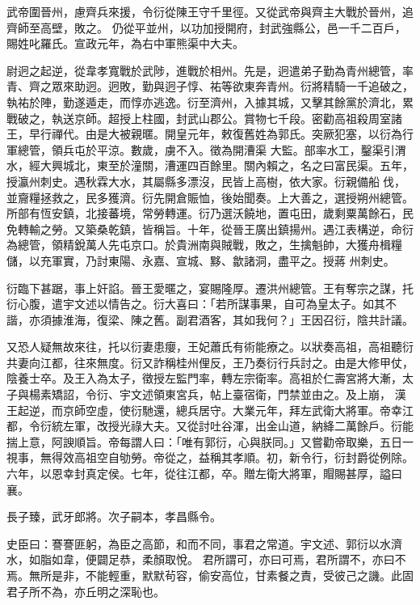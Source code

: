 \begin{pinyinscope}
 武帝圍晉州，慮齊兵來援，令衍從陳王守千里徑。又從武帝與齊主大戰於晉州，追齊師至高壁，敗之。
 仍從平並州，以功加授開府，封武強縣公，邑一千二百戶，賜姓叱羅氏。宣政元年，為右中軍熊渠中大夫。



 尉迥之起逆，從韋孝寬戰於武陟，進戰於相州。先是，迥遣弟子勤為青州總管，率青、齊之眾來助迥。迥敗，勤與迥子惇、祐等欲東奔青州。衍將精騎一千追破之，執祐於陣，勤遂遁走，而惇亦逃逸。衍至濟州，入據其城，又擊其餘黨於濟北，累戰破之，執送京師。超授上柱國，封武山郡公。賞物七千段。密勸高祖殺周室諸王，早行禪代。由是大被親暱。開皇元年，敕復舊姓為郭氏。突厥犯塞，以衍為行軍總管，領兵屯於平涼。數歲，虜不入。徵為開漕渠
 大監。部率水工，鑿渠引渭水，經大興城北，東至於潼關，漕運四百餘里。關內賴之，名之曰富民渠。五年，授瀛州刺史。遇秋霖大水，其屬縣多漂沒，民皆上高樹，依大家。衍親備船伐，並齎糧拯救之，民多獲濟。衍先開倉賑恤，後始聞奏。上大善之，選授朔州總管。所部有恆安鎮，北接蕃境，常勞轉運。衍乃選沃饒地，置屯田，歲剩粟萬餘石，民免轉輸之勞。又築桑乾鎮，皆稱旨。十年，從晉王廣出鎮揚州。遇江表構逆，命衍為總管，領精銳萬人先屯京口。於貴洲南與賊戰，敗之，生擒魁帥，大獲舟楫糧儲，以充軍實，乃討東陽、永嘉、宣城、黟、歙諸洞，盡平之。授蔣
 州刺史。



 衍臨下甚踞，事上奸諂。晉王愛暱之，宴賜隆厚。遷洪州總管。王有奪宗之謀，托衍心腹，遣宇文述以情告之。衍大喜曰：「若所謀事果，自可為皇太子。如其不諧，亦須據淮海，復梁、陳之舊。副君酒客，其如我何？」王因召衍，陰共計議。



 又恐人疑無故來往，托以衍妻患癭，王妃蕭氏有術能療之。以狀奏高祖，高祖聽衍共妻向江都，往來無度。衍又詐稱桂州俚反，王乃奏衍行兵討之。由是大修甲仗，陰養士卒。及王入為太子，徵授左監門率，轉左宗衛率。高祖於仁壽宮將大漸，太子與楊素矯詔，令衍、宇文述領東宮兵，帖上臺宿衛，門禁並由之。及上崩，
 漢王起逆，而京師空虛，使衍馳還，總兵居守。大業元年，拜左武衛大將軍。帝幸江都，令衍統左軍，改授光祿大夫。又從討吐谷渾，出金山道，納絳二萬餘戶。衍能揣上意，阿諛順旨。帝每謂人曰：「唯有郭衍，心與朕同。」又嘗勸帝取樂，五日一視事，無得效高祖空自劬勞。帝從之，益稱其孝順。初，新令行，衍封爵從例除。六年，以恩幸封真定侯。七年，從往江都，卒。贈左衛大將軍，賵賜甚厚，謚曰襄。



 長子臻，武牙郎將。次子嗣本，孝昌縣令。



 史臣曰：謇謇匪躬，為臣之高節，和而不同，事君之常道。宇文述、郭衍以水濟水，如脂如韋，便闢足恭，柔顏取悅。
 君所謂可，亦曰可焉，君所謂不，亦曰不焉。無所是非，不能輕重，默默茍容，偷安高位，甘素餐之責，受彼己之譏。此固君子所不為，亦丘明之深恥也。



\end{pinyinscope}